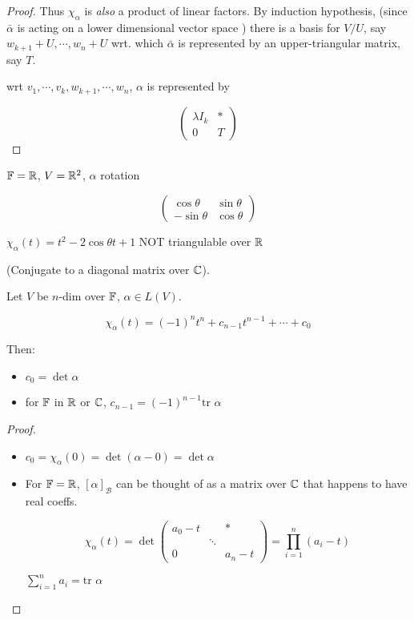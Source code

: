 \documentclass[a4paper]{article}
\begin{document}
\begin{proof}
	Thus $ \chi_{\alpha} $ is \emph{also} a product of linear factors. By induction hypothesis, (since $ \bar{\alpha} $ is acting on a lower dimensional vector space ) there is a basis for $ V / U $, say $ w_{k+1} + U,\cdots,w_{n} + U $ wrt. which $ \bar{\alpha} $ is represented by an upper-triangular matrix, say $ T $.
	
	wrt $ v_{1},\cdots,v_{k},w_{k+1},\cdots,w_{n} $, $ \alpha $ is represented by 
	
	\[ \begin{pmatrix}
	\lambda I_{k} & * \\
	0 & T
	\end{pmatrix} \] 
	
\end{proof}

\begin{eg}
	$ \mathbb{F} = \mathbb{R} $, $ V = \mathbb{R}^{2} $, $ \alpha $ rotation
	
	\[ \begin{pmatrix}
	\cos \theta & \sin \theta \\
	- \sin \theta & \cos \theta
	\end{pmatrix} \]
	
	$ \chi_{\alpha}(t) = t^{2} - 2 \cos \theta t + 1 $ NOT triangulable over $ \mathbb{R} $
	
	(Conjugate to a diagonal matrix over $ \mathbb{C} $).
\end{eg}

\begin{lemma} 
	Let $ V $ be $ n $-dim over $ \mathbb{F} $, $ \alpha \in L(V) $. 
	
	\[ \chi_{\alpha}(t) = (-1)^{n}t^{n} + c_{n-1}t^{n-1} + \cdots + c_{0} \]
	
	Then:
	
	\begin{itemize}
		\item $ c_{0} = \det \alpha $
		\item for $ \mathbb{F} $ in $ \mathbb{R} $ or $ \mathbb{C} $, $ c_{n-1} = (-1)^{n-1} \text{tr }\alpha $
	\end{itemize}
\end{lemma}

\begin{proof}
	\begin{itemize}
		\item 	$ c_{0} = \chi_{\alpha}(0) = \det(\alpha - 0) = \det \alpha $
		\item For $ \mathbb{F} = \mathbb{R}  $, $ [\alpha]_{\mathcal{B}} $ can be thought of as a matrix over $ \mathbb{C} $ that happens to have real coeffs.
		
		\[ \chi_{\alpha}(t) = \det \begin{pmatrix}
		a_{0} - t & & *\\
		& \ddots & \\
		0 & & a_{n} - t
		\end{pmatrix} = \prod_{i=1}^{n} (a_{i} - t)  \]
		
		$ \sum_{i=1}^{n} a_{i} = \text{tr } \alpha $
	\end{itemize}
\end{proof}
\end{document}
